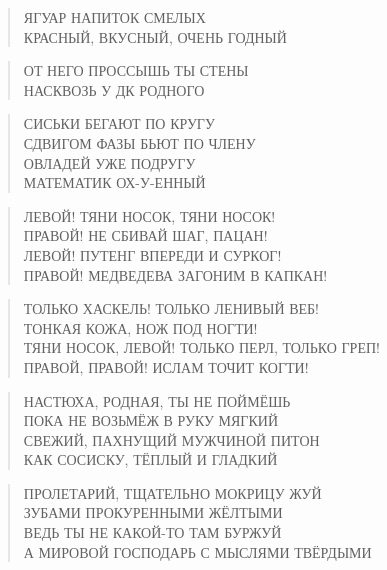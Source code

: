 \poemtitle{***}
\begin{verse}
ЯГУАР НАПИТОК СМЕЛЫХ\\
КРАСНЫЙ, ВКУСНЫЙ, ОЧЕНЬ ГОДНЫЙ
\end{verse}

\poemtitle{***}
\begin{verse}
ОТ НЕГО ПРОССЫШЬ ТЫ СТЕНЫ\\
НАСКВОЗЬ У ДК РОДНОГО
\end{verse}

\poemtitle{***}
\begin{verse}
СИСЬКИ БЕГАЮТ ПО КРУГУ\\
СДВИГОМ ФАЗЫ БЬЮТ ПО ЧЛЕНУ\\
ОВЛАДЕЙ УЖЕ ПОДРУГУ\\
МАТЕМАТИК ОХ-У-ЕННЫЙ
\end{verse}

\poemtitle{***}
\begin{verse}
ЛЕВОЙ! ТЯНИ НОСОК, ТЯНИ НОСОК!\\
ПРАВОЙ! НЕ СБИВАЙ ШАГ, ПАЦАН!\\
ЛЕВОЙ! ПУТЕНГ ВПЕРЕДИ И СУРКОГ!\\
ПРАВОЙ! МЕДВЕДЕВА ЗАГОНИМ В КАПКАН!
\end{verse}

\poemtitle{***}
\begin{verse}
ТОЛЬКО ХАСКЕЛЬ! ТОЛЬКО ЛЕНИВЫЙ ВЕБ!\\
ТОНКАЯ КОЖА, НОЖ ПОД НОГТИ!\\
ТЯНИ НОСОК, ЛЕВОЙ! ТОЛЬКО ПЕРЛ, ТОЛЬКО ГРЕП!\\
ПРАВОЙ, ПРАВОЙ! ИСЛАМ ТОЧИТ КОГТИ!
\end{verse}

\poemtitle{***}
\begin{verse}
НАСТЮХА, РОДНАЯ, ТЫ НЕ ПОЙМЁШЬ\\
ПОКА НЕ ВОЗЬМЁЖ В РУКУ МЯГКИЙ\\
СВЕЖИЙ, ПАХНУЩИЙ МУЖЧИНОЙ ПИТОН\\
КАК СОСИСКУ, ТЁПЛЫЙ И ГЛАДКИЙ
\end{verse}

\poemtitle{***}
\begin{verse}
ПРОЛЕТАРИЙ, ТЩАТЕЛЬНО МОКРИЦУ ЖУЙ\\
       ЗУБАМИ ПРОКУРЕННЫМИ ЖЁЛТЫМИ\\
ВЕДЬ ТЫ НЕ КАКОЙ-ТО ТАМ БУРЖУЙ\\
       А МИРОВОЙ ГОСПОДАРЬ С МЫСЛЯМИ ТВЁРДЫМИ
\end{verse}

